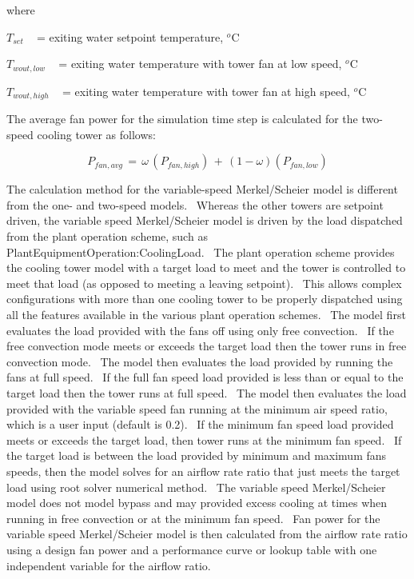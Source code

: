 where

\({T_{set}}\) ~ = exiting water setpoint temperature, \(^{o}\)C

\({T_{wout,low}}\) ~ = exiting water temperature with tower fan at low speed, \(^{o}\)C

\({T_{wout,high}}\) ~ = exiting water temperature with tower fan at high speed, \(^{o}\)C

The average fan power for the simulation time step is calculated for the two-speed cooling tower as follows:

\begin{equation}
{P_{fan,avg}}\, = \,\omega \,({P_{fan,high}})\, + \,\left( {1 - \omega } \right)\left( {{P_{fan,low}}} \right)
\end{equation}

The calculation method for the variable-speed Merkel/Scheier model is different from the one- and two-speed models.~ Whereas the other towers are setpoint driven, the variable speed Merkel/Scheier model is driven by the load dispatched from the plant operation scheme, such as PlantEquipmentOperation:CoolingLoad.~ The plant operation scheme provides the cooling tower model with a target load to meet and the tower is controlled to meet that load (as opposed to meeting a leaving setpoint).~ This allows complex configurations with more than one cooling tower to be properly dispatched using all the features available in the various plant operation schemes.~ The model first evaluates the load provided with the fans off using only free convection.~ If the free convection mode meets or exceeds the target load then the tower runs in free convection mode.~ The model then evaluates the load provided by running the fans at full speed.~ If the full fan speed load provided is less than or equal to the target load then the tower runs at full speed.~ The model then evaluates the load provided with the variable speed fan running at the minimum air speed ratio, which is a user input (default is 0.2).~ If the minimum fan speed load provided meets or exceeds the target load, then tower runs at the minimum fan speed.~ If the target load is between the load provided by minimum and maximum fans speeds, then the model solves for an airflow rate ratio that just meets the target load using root solver numerical method.~ The variable speed Merkel/Scheier model does not model bypass and may provided excess cooling at times when running in free convection or at the minimum fan speed.~ Fan power for the variable speed Merkel/Scheier model is then calculated from the airflow rate ratio using a design fan power and a performance curve or lookup table with one independent variable for the airflow ratio.


